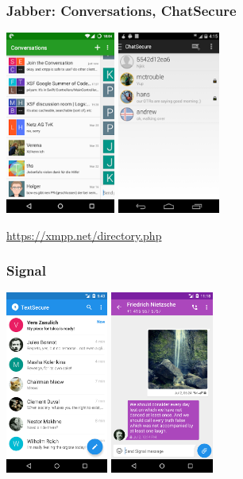 \documentclass[12pt, xcolor={svgnames,table}]{beamer}
\begin{document}
\begin{frame}
  \frametitle{Jabber: Conversations, ChatSecure}
    \begin{center}
      \includegraphics[height=6cm]{img/conversations.png}
      \hspace{0.5cm}
      \includegraphics[height=6cm]{img/chatsecure.png}
    \end{center}
    \url{https://xmpp.net/directory.php}
\end{frame}

\begin{frame}
  \frametitle{Signal}
    \begin{center}
      \includegraphics[height=6cm]{img/signal1.png}
      \hspace{0.5cm}
      \includegraphics[height=6cm]{img/signal2.png}
    \end{center}
\end{frame}
\end{document}

